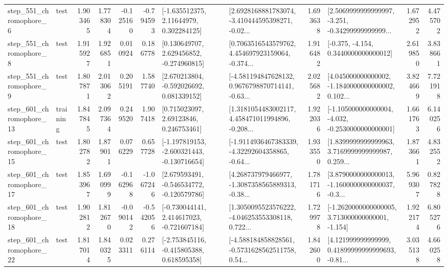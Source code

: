 \begin{tabular}{llrrrrllrlrr}
   step\_551\_chromophore\_6 &      test &      1.903465 &    1.778304 &     -0.125160 & -0.794593 &     [-1.635512375, 2.11644979, 0.302284125] &  [2.6928168881783074, -3.410444595398271, -0.02... &       1.693638 &  [2.5069999999999997, -3.251, -0.34299999999999... &            1.672952 &          4.475702 \\
   step\_551\_chromophore\_8 &      test &      1.915927 &    1.926851 &      0.010924 &  0.186778 &    [0.130649707, 2.629456852, -0.274960815] &  [0.7063516543579762, 4.454697923159064, -0.374... &       1.916482 &               [-0.375, -4.154, 0.3440000000000012] &            2.619850 &          3.838661 \\
   step\_551\_chromophore\_9 &      test &      1.807871 &    2.013062 &      0.205191 &  1.587740 &    [2.670213804, -0.592026692, 0.081339152] &  [-4.581194847628132, 0.9676798870714141, -0.63... &       2.025682 &  [4.045000000000002, -1.1840000000000002, 0.102... &            3.824669 &          7.721918 \\
  step\_601\_chromophore\_13 &  training &      1.847845 &    2.097364 &      0.249520 &  1.907418 &      [0.715023097, 2.69123846, 0.246753461] &  [1.3181054483002117, 4.458471011994896, -0.208... &       1.922036 &  [-1.105000000000004, -4.032, -0.2530000000000001] &            1.661763 &          6.140256 \\
  step\_601\_chromophore\_15 &      test &      1.802782 &    1.879011 &      0.076229 &  0.657728 &  [-1.197819153, -2.600321443, -0.130716654] &  [-1.9114936467383339, -4.32292604358865, -0.64... &       1.933550 &  [1.8399999999999963, 3.7169999999999987, 0.259... &            1.873661 &          4.832552 \\
  step\_601\_chromophore\_17 &      test &      1.853967 &    1.690999 &     -0.162968 & -1.067246 &   [2.679593491, -0.546534772, -0.120579786] &  [4.268737979466977, -1.3087358565889313, -0.38... &       1.781716 &  [3.8790000000000013, -1.1600000000000037, -0.3... &            5.969307 &          0.827828 \\
  step\_601\_chromophore\_18 &      test &      1.902812 &    1.812670 &     -0.090142 & -0.542056 &   [-0.730044141, 2.414617023, -0.721607184] &  [1.3050095523576222, -4.046253553308118, 0.722... &       1.729978 &   [-1.2620000000000005, 3.713000000000001, -1.154] &            1.922174 &          6.805276 \\
  step\_601\_chromophore\_22 &      test &      1.817014 &    1.840325 &      0.023311 &  0.276114 &   [-2.753845116, -0.415805388, 0.618595358] &  [-4.588184858828561, -0.5731628562511758, 0.54... &       1.842600 &  [4.121999999999999, 0.41899999999999693, -0.81... &            3.035138 &          4.660258 \\

\end{tabular}
